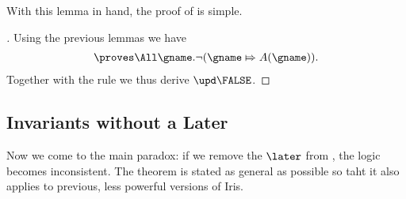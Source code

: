 With this lemma in hand, the proof of  is simple.
\begin{proof}[]
  Using the previous lemmas we have
  \begin{align*}
    \proves \All \gname. \lnot (\gname \Mapsto A(\gname)).
  \end{align*}
  Together with the rule  we thus derive $\upd \FALSE$.
\end{proof}

\subsection{Invariants without a Later}
\label{app:section:invariants-without-a-later}

Now we come to the main paradox: if we remove the $\later$ from , the logic becomes inconsistent.
The theorem is stated as general as possible so taht it also applies to previous, less powerful versions of Iris.

